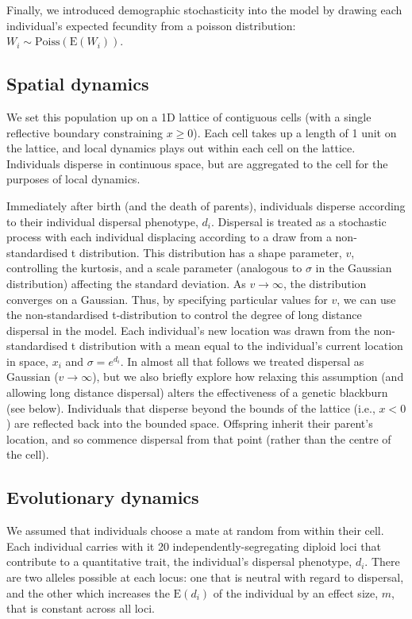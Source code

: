 \documentclass{article}
\begin{document}
Finally, we introduced demographic stochasticity into the model by
drawing each individual's expected fecundity from a poisson
distribution: \(W_i\sim\text{Poiss}(\text{E}(W_i))\).

\subsection{Spatial dynamics}

We set this population up on a 1D lattice of contiguous cells (with a
single reflective boundary constraining \(x\geq 0\)). Each cell takes up
a length of 1 unit on the lattice, and local dynamics plays out within
each cell on the lattice. Individuals disperse in continuous space, but
are aggregated to the cell for the purposes of local dynamics.

Immediately after birth (and the death of parents), individuals disperse
according to their individual dispersal phenotype, \(d_i\). Dispersal is
treated as a stochastic process with each individual displacing
according to a draw from a non-standardised t distribution.  This distribution has a shape parameter, $v$, controlling the kurtosis, and a scale parameter (analogous to $\sigma$ in the Gaussian distribution) affecting the standard deviation.  As $v \rightarrow \infty$, the distribution converges on a Gaussian.  Thus, by specifying particular values for $v$, we can use the non-standardised t-distribution to control the degree of long distance dispersal in the model.  Each individual's new location was drawn from the non-standardised t distribution with a mean equal to the
individual's current location in space, \(x_i\) and $\sigma=e^{d_i}$.   In almost all that follows we treated dispersal as Gaussian ($v \rightarrow \infty$), but we also briefly explore how relaxing this assumption (and allowing long distance dispersal) alters the effectiveness of a genetic blackburn (see below).  Individuals that disperse beyond the bounds of the
lattice (i.e., \(x<0\)) are reflected back into the bounded space.
Offspring inherit their parent's location, and so commence dispersal
from that point (rather than the centre of the cell).

\subsection{Evolutionary dynamics}

We assumed that individuals choose a mate at random from within their cell. Each
individual carries with it 20 independently-segregating diploid loci that contribute to a quantitative trait, the individual's dispersal phenotype, $d_i$.  There are two alleles possible at each locus: one that is neutral with
regard to dispersal, and the other which increases the \(\text{E}(d_i)\)
of the individual by an effect size, $m$, that is constant across all
loci. 
\end{document}
